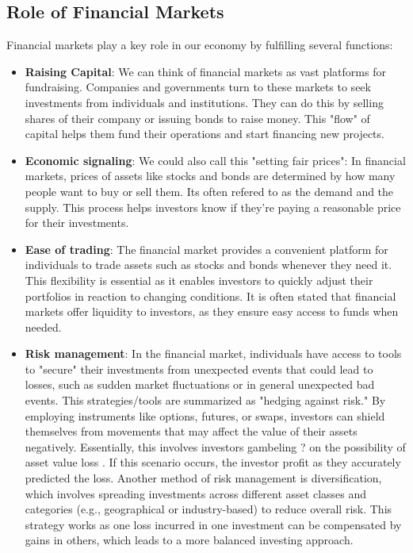 \documentclass{article}
\begin{document}
\subsection{Role of Financial Markets} 
Financial markets play a key role in our economy by fulfilling several functions:
\begin{itemize}
    \item \textbf{Raising Capital}:
    We can think of financial markets as vast platforms for fundraising. Companies and governments turn to these markets to seek investments from individuals and institutions. They can do this by selling shares of their company or issuing bonds to raise money. This "flow" of capital helps them fund their operations and start financing  new projects.
    
    \item \textbf{Economic signaling}: We could also call this "setting fair prices": In financial markets, prices of assets like stocks and bonds are determined by how many people want to buy or sell them. Its often refered to as the demand and the supply. This process helps investors know if they're paying a reasonable price for their investments.
    
    \item \textbf{Ease of trading}: The financial market provides a convenient platform for individuals to trade assets such as stocks and bonds whenever they need it. This flexibility is essential as it enables investors to quickly adjust their portfolios in reaction to changing conditions. It is often stated that financial markets offer liquidity to investors, as they ensure easy access to funds when needed.
    
    \item \textbf{Risk management}: In the financial market, individuals have access to tools to "secure" their investments from unexpected events that could lead to losses, such as sudden market fluctuations or in general unexpected bad events. This strategies/tools are summarized as "hedging against risk." By employing instruments like options, futures, or swaps, investors can shield themselves from  movements that may affect the value of their assets negatively. Essentially, this involves investors gambeling ? on the possibility of asset value loss . If this scenario occurs, the investor profit as they accurately predicted the loss. Another method of risk management is diversification, which involves spreading investments across different asset classes and categories (e.g., geographical or industry-based) to reduce overall risk. This strategy works as one loss incurred in one investment can be compensated by gains in others, which leads to a more balanced investing approach.
    

\end{itemize}
\end{document}
